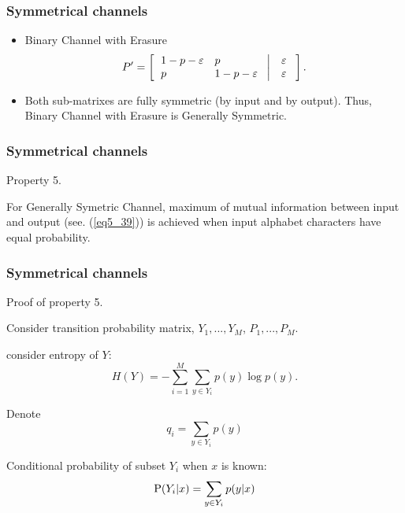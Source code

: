 \documentclass[14pt]{beamer}
\begin{document}
\begin{frame}
\frametitle{Symmetrical channels}
\begin{itemize}
    \item Binary Channel with Erasure
    \[
    {P}' = \left[ {\left. {{\begin{array}{*{20}c}
    {1 - p - \varepsilon } \hfill & p \hfill \\
    p \hfill & {1 - p - \varepsilon } \hfill \\
    \end{array} }\mbox{ }} \right|\mbox{ }{\begin{array}{*{20}c}
    \varepsilon \hfill \\
    \varepsilon \hfill \\
    \end{array} }\mbox{ }} \right].
    \]
    
    \item Both sub-matrixes are fully symmetric (by input and by output). Thus, Binary Channel with Erasure is Generally Symmetric.

\end{itemize}
\end{frame}


\begin{frame}
\frametitle{Symmetrical channels}
Property 5.
    \begin{prop}\label{pr5_5}  
    For Generally Symetric Channel, maximum of mutual information between input and output (see. (\ref{eq5_39})) is achieved when input alphabet characters have equal probability.
    \end{prop}
\end{frame}




\begin{frame}
\frametitle{Symmetrical channels}
Proof of property 5.
\begin{itemize}
\small{
   
    \item Consider transition probability matrix, $Y_1 ,...,Y_M $, $P_1 ,...,P_M $. 
    \item consider entropy of $Y$:
    \begin{equation}
        \label{eq5_42} H(Y) = - \sum\limits_{i = 1}^M {\sum\limits_{y \in Y_i } {p(y)\log p(y)} } .
    \end{equation}
    
    \item Denote 
    \[
    q_i = \sum\limits_{y \in Y_i } {p(y)}
    \]
    
    \item Conditional probability of subset $Y_i $ when $x$ is known:
    \[
    {\rm P}(Y_i \vert x) = \sum\limits_{y \in Y_i } {p(y\vert x)}
    \]  
    
}
\end{itemize}
\end{frame}
\end{document}
